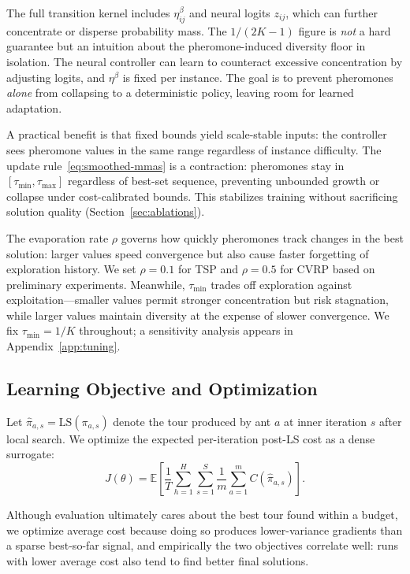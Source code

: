 \documentclass[sigconf,anonymous,review]{acmart}
\theoremstyle{definition}
\theoremstyle{plain}
\begin{document}
The full transition kernel includes $\eta_{ij}^\beta$ and neural logits $z_{ij}$, which can further concentrate or disperse probability mass.
The $1/(2K-1)$ figure is \emph{not} a hard guarantee but an intuition about the pheromone-induced diversity floor in isolation.
The neural controller can learn to counteract excessive concentration by adjusting logits, and $\eta^\beta$ is fixed per instance.
The goal is to prevent pheromones \emph{alone} from collapsing to a deterministic policy, leaving room for learned adaptation.

A practical benefit is that fixed bounds yield scale-stable inputs: the controller sees pheromone values in the same range regardless of instance difficulty.
The update rule~\eqref{eq:smoothed-mmas} is a contraction: pheromones stay in $[\tau_{\min}, \tau_{\max}]$ regardless of best-set sequence, preventing unbounded growth or collapse under cost-calibrated bounds.
This stabilizes training without sacrificing solution quality (Section~\ref{sec:ablations}).

The evaporation rate $\rho$ governs how quickly pheromones track changes in the best solution: larger values speed convergence but also cause faster forgetting of exploration history.
We set $\rho=0.1$ for TSP and $\rho=0.5$ for CVRP based on preliminary experiments.
Meanwhile, $\tau_{\min}$ trades off exploration against exploitation---smaller values permit stronger concentration but risk stagnation, while larger values maintain diversity at the expense of slower convergence.
We fix $\tau_{\min} = 1/K$ throughout; a sensitivity analysis appears in Appendix~\ref{app:tuning}.

\subsection{Learning Objective and Optimization}
\label{sec:training}
Let $\hat{\pi}_{a,s} = \mathrm{LS}(\pi_{a,s})$ denote the tour produced by ant $a$ at inner iteration $s$ after local search.
We optimize the expected per-iteration post-LS cost as a dense surrogate:
\begin{equation}
J(\theta) = \mathbb{E} \left[ \frac{1}{T} \sum_{h=1}^H \sum_{s=1}^S \frac{1}{m} \sum_{a=1}^m C(\hat{\pi}_{a,s}) \right].
\end{equation}

Although evaluation ultimately cares about the best tour found within a budget, we optimize average cost because doing so produces lower-variance gradients than a sparse best-so-far signal, and empirically the two objectives correlate well: runs with lower average cost also tend to find better final solutions.
\end{document}
